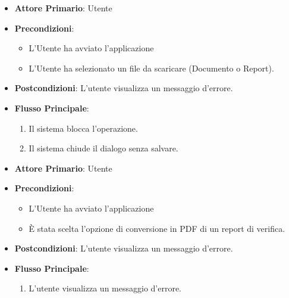 \begin{itemize}
    \item \textbf{Attore Primario}: Utente
    \item \textbf{Precondizioni}: 
        \begin{itemize}
            \item L'Utente ha avviato l'applicazione
            \item L'Utente ha selezionato un file da scaricare (Documento o Report).
        \end{itemize} 
    \item \textbf{Postcondizioni}: L'utente visualizza un messaggio d'errore.
    \item \textbf{Flusso Principale}:
        \begin{enumerate}
            \item Il sistema blocca l'operazione.
            \item Il sistema chiude il dialogo senza salvare.
        \end{enumerate}
\end{itemize}

\begin{itemize}
    \item \textbf{Attore Primario}: Utente
    \item \textbf{Precondizioni}: 
        \begin{itemize}
            \item L'Utente ha avviato l'applicazione
            \item È stata scelta l'opzione di conversione in PDF di un report di verifica.
        \end{itemize} 
    \item \textbf{Postcondizioni}: L'utente visualizza un messaggio d'errore.     
    \item \textbf{Flusso Principale}:
        \begin{enumerate}
            \item L'utente visualizza un messaggio d'errore.
        \end{enumerate}
\end{itemize}
